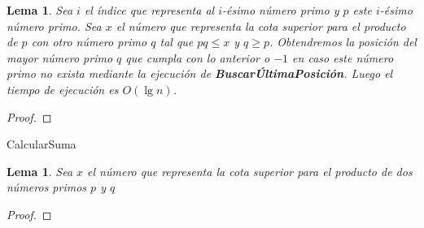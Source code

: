 \documentclass{article}
\newcommand\cppfile[2][]{}
\newtheorem{lemma}[theorem]{Lema}
\theoremstyle{definition}
\theoremstyle{remark}
\begin{document}
\begin{lemma}
Sea $i$ el \'indice que representa al $i$-\'esimo n\'umero primo
y $p$ este $i$-\'esimo n\'umero primo.
Sea $x$ el n\'umero que representa la cota superior para el producto de $p$ con otro n\'umero primo $q$ tal que $pq \leq x$ y $q \geq p$.
Obtendremos la posici\'on del mayor n\'umero primo $q$ que cumpla con lo anterior o
$-1$ en caso este n\'umero primo no exista
mediante la ejecuci\'on de \textbf{Buscar\'UltimaPosici\'on}.
Luego el tiempo de ejecuci\'on es $O(\lg n)$.
\end{lemma}

\begin{proof}
\end{proof}

\begin{algorithm}[H]
\SetAlgoLined
\DontPrintSemicolon
{}
\caption{CalcularSuma\label{CS}}
\end{algorithm}

\begin{lemma}
Sea $x$ el n\'umero que representa la cota superior para el producto de dos n\'umeros primos
$p$ y $q$ 
\end{lemma}

\begin{proof}
\end{proof}

\cppfile{formula_selberg.cpp}
\end{document}
